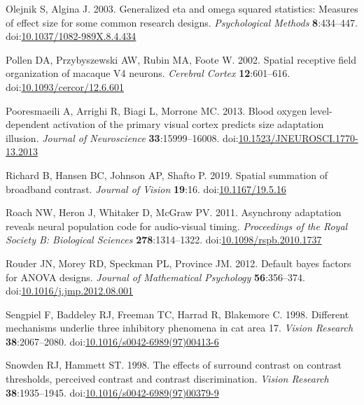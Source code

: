 \documentclass[
]{article}
\newlength{\cslhangindent}
\newlength{\cslentryspacingunit} %
\newenvironment{CSLReferences}[2] %
 {%
  \setlength{\parindent}{0pt}
  \ifodd #1
  \let\oldpar\par
  \def\par{\hangindent=\cslhangindent\oldpar}
  \fi
  \setlength{\parskip}{#2\cslentryspacingunit}
 }%
 {}
\begin{document}
\begin{CSLReferences}{1}{0}
\leavevmode{}%
Olejnik S, Algina J. 2003. Generalized eta and omega squared statistics: Measures of effect size for some common research designs. \emph{Psychological Methods} \textbf{8}:434--447. doi:\href{https://doi.org/10.1037/1082-989X.8.4.434}{10.1037/1082-989X.8.4.434}

\leavevmode{}%
Pollen DA, Przybyszewski AW, Rubin MA, Foote W. 2002. Spatial receptive field organization of macaque V4 neurons. \emph{Cerebral Cortex} \textbf{12}:601--616. doi:\href{https://doi.org/10.1093/cercor/12.6.601}{10.1093/cercor/12.6.601}

\leavevmode{}%
Pooresmaeili A, Arrighi R, Biagi L, Morrone MC. 2013. Blood oxygen level-dependent activation of the primary visual cortex predicts size adaptation illusion. \emph{Journal of Neuroscience} \textbf{33}:15999--16008. doi:\href{https://doi.org/10.1523/JNEUROSCI.1770-13.2013}{10.1523/JNEUROSCI.1770-13.2013}

\leavevmode{}%
Richard B, Hansen BC, Johnson AP, Shafto P. 2019. Spatial summation of broadband contrast. \emph{Journal of Vision} \textbf{19}:16. doi:\href{https://doi.org/10.1167/19.5.16}{10.1167/19.5.16}

\leavevmode{}%
Roach NW, Heron J, Whitaker D, McGraw PV. 2011. Asynchrony adaptation reveals neural population code for audio-visual timing. \emph{Proceedings of the Royal Society B: Biological Sciences} \textbf{278}:1314--1322. doi:\href{https://doi.org/10.1098/rspb.2010.1737}{10.1098/rspb.2010.1737}

\leavevmode{}%
Rouder JN, Morey RD, Speckman PL, Province JM. 2012. Default bayes factors for ANOVA designs. \emph{Journal of Mathematical Psychology} \textbf{56}:356--374. doi:\href{https://doi.org/10.1016/j.jmp.2012.08.001}{10.1016/j.jmp.2012.08.001}

\leavevmode{}%
Sengpiel F, Baddeley RJ, Freeman TC, Harrad R, Blakemore C. 1998. Different mechanisms underlie three inhibitory phenomena in cat area 17. \emph{Vision Research} \textbf{38}:2067--2080. doi:\href{https://doi.org/10.1016/s0042-6989(97)00413-6}{10.1016/s0042-6989(97)00413-6}

\leavevmode{}%
Snowden RJ, Hammett ST. 1998. The effects of surround contrast on contrast thresholds, perceived contrast and contrast discrimination. \emph{Vision Research} \textbf{38}:1935--1945. doi:\href{https://doi.org/10.1016/s0042-6989(97)00379-9}{10.1016/s0042-6989(97)00379-9}


\end{CSLReferences}
\end{document}
